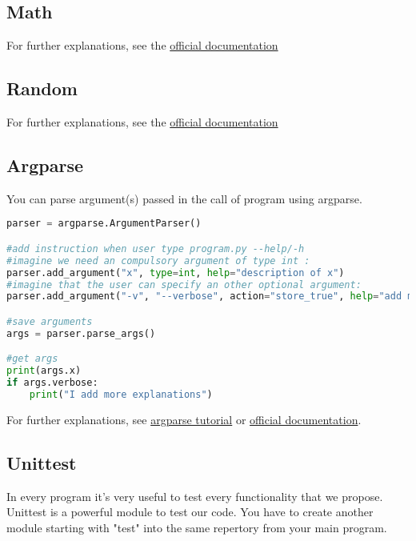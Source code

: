 \documentclass[a4paper, 12pt, titlepage]{scrartcl} %
\begin{document}
\subsection{Math}
For further explanations, see the \href{https://docs.python.org/3/library/math.html}{official documentation}

\subsection{Random}
For further explanations, see the \href{https://docs.python.org/3/library/random.html}{official documentation}

\subsection{Argparse}
You can parse argument(s) passed in the call of program using argparse.
\begin{lstlisting}[language=Python]
parser = argparse.ArgumentParser()

#add instruction when user type program.py --help/-h
#imagine we need an compulsory argument of type int :
parser.add_argument("x", type=int, help="description of x")
#imagine that the user can specify an other optional argument:
parser.add_argument("-v", "--verbose", action="store_true", help="add more explanation")

#save arguments
args = parser.parse_args()

#get args
print(args.x)
if args.verbose:
    print("I add more explanations")
\end{lstlisting} \vspace{5mm}
For further explanations, see \href{http://www.sharelatex.com}{argparse tutorial} or  \href{https://docs.python.org/3/library/argparse.html}{official documentation}.


\subsection{Unittest}
In every program it's very useful to test every functionality that we propose. Unittest is a powerful module to test our code. You have to create another module starting with "test" into the same repertory from your main program.

\vspace{5mm}
\end{document}
